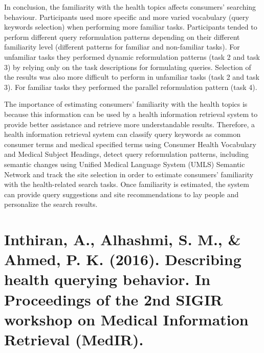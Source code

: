 \documentclass[]{article}
\begin{document}
In conclusion, the familiarity with the health topics affects consumers' searching behaviour. Participants used more specific and more varied vocabulary (query keywords selection) when performing more familiar tasks. Participants tended to perform different query reformulation patterns depending on their different familiarity level (different patterns for familiar and non-familiar tasks). For unfamiliar tasks they performed dynamic reformulation patterns (task 2 and task 3) by relying only on the task descriptions for formulating queries. Selection of the results was also more difficult to perform in unfamiliar tasks (task 2 and task 3). For familiar tasks they performed the parallel reformulation pattern (task 4).     


The importance of estimating consumers' familiarity with the health topics is because this information can be used by a health information retrieval system to provide better assistance and retrieve more understandable results. Therefore, a health information retrieval system can classify query keywords as common consumer terms and medical specified terms using Consumer Health Vocabulary and Medical Subject Headings, detect query reformulation patterns, including semantic changes using Unified Medical Language System (UMLS) Semantic Network and track the site selection in order to estimate consumers' familiarity with the health-related search tasks. Once familiarity is estimated, the system can provide query suggestions and site recommendations to lay people and personalize the search results. 	
	
\section{Inthiran, A., Alhashmi, S. M., \& Ahmed, P. K. (2016). Describing health querying behavior. In Proceedings of the 2nd SIGIR workshop on Medical Information Retrieval (MedIR).} 
\end{document}
